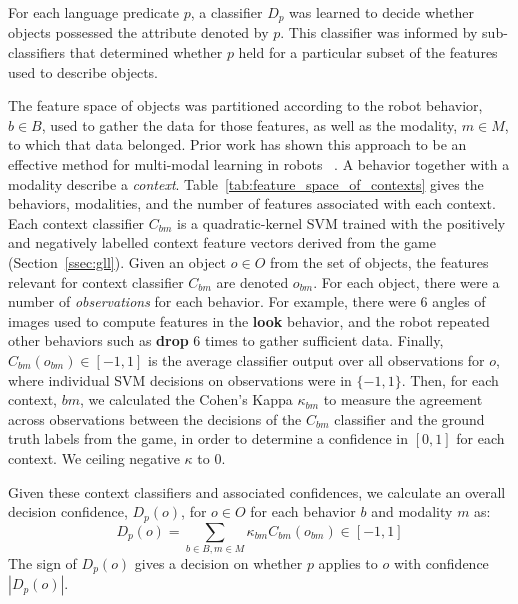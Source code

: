 For each language predicate $p$, a classifier $D_p$ was learned to decide whether objects possessed the attribute denoted by $p$.
This classifier was informed by sub-classifiers that determined whether $p$ held for a particular subset of the features used to describe objects.

The feature space of objects was partitioned according to the robot behavior, $b\in B$, used to gather the data for those features, as well as the modality, $m\in M$, to which that data belonged.
Prior work has shown this approach to be an effective method for multi-modal learning in robots ~\cite{sinapov:icra14}.
A behavior together with a modality describe a \textit{context}.
Table~\ref{tab:feature_space_of_contexts} gives the behaviors, modalities, and the number of features associated with each context.
Each context classifier $C_{bm}$ is a quadratic-kernel SVM trained with the positively and negatively labelled context feature vectors derived from the \ispy game (Section~\ref{ssec:gll}).
Given an object $o\in O$ from the set of objects, the features relevant for context classifier $C_{bm}$ are denoted $o_{bm}$.
For each object, there were a number of \textit{observations} for each behavior.
For example, there were 6 angles of images used to compute features in the \textbf{look} behavior, and the robot repeated other behaviors such as \textbf{drop} 6 times to gather sufficient data.
Finally, $C_{bm}(o_{bm})\in [-1,1]$ is the average classifier output over all observations for $o$, where individual SVM decisions on observations were in $\{-1,1\}$.
Then, for each context, $bm$, we calculated the Cohen's Kappa $\kappa_{bm}$ to measure the agreement across observations between the decisions of the $C_{bm}$ classifier and the ground truth labels from the \ispy game, in order to determine a confidence in $[0,1]$ for each context.  We ceiling negative $\kappa$ to $0$.

Given these context classifiers and associated confidences, we calculate an overall decision confidence, $D_p(o)$, for $o\in O$ for each behavior $b$ and modality $m$ as:
\begin{equation}
	D_p(o) = \sum_{b\in B,m\in M}{\kappa_{bm} C_{bm}(o_{bm})} \in [-1,1]
\end{equation}
The sign of $D_p(o)$ gives a decision on whether $p$ applies to $o$ with confidence $|D_p(o)|$.
